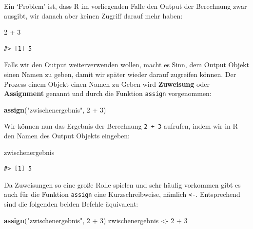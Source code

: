 \documentclass[]{tufte-book}
\newenvironment{Shaded}{}{}
\newcommand{\KeywordTok}[1]{\textcolor[rgb]{0.00,0.44,0.13}{\textbf{#1}}}
\newcommand{\DecValTok}[1]{\textcolor[rgb]{0.25,0.63,0.44}{#1}}
\newcommand{\StringTok}[1]{\textcolor[rgb]{0.25,0.44,0.63}{#1}}
\newcommand{\OperatorTok}[1]{\textcolor[rgb]{0.40,0.40,0.40}{#1}}
\newcommand{\NormalTok}[1]{#1}
\begin{document}
Ein `Problem' ist, dass R im vorliegenden Falle den Output der
Berechnung zwar ausgibt, wir danach aber keinen Zugriff darauf mehr
haben:

\begin{Shaded}
\begin{Highlighting}[]
\DecValTok{2} \OperatorTok{+}\StringTok{ }\DecValTok{3}
\end{Highlighting}
\end{Shaded}

\begin{verbatim}
#> [1] 5
\end{verbatim}

Falls wir den Output weiterverwenden wollen, macht es Sinn, dem Output
Objekt einen Namen zu geben, damit wir später wieder darauf zugreifen
können. Der Prozess einem Objekt einen Namen zu Geben wird
\textbf{Zuweisung} oder \textbf{Assignment} genannt und durch die
Funktion \texttt{assign} vorgenommen:

\begin{Shaded}
\begin{Highlighting}[]
\KeywordTok{assign}\NormalTok{(}\StringTok{"zwischenergebnis"}\NormalTok{, }\DecValTok{2} \OperatorTok{+}\StringTok{ }\DecValTok{3}\NormalTok{)}
\end{Highlighting}
\end{Shaded}

Wir können nun das Ergebnis der Berechnung \texttt{2\ +\ 3} aufrufen,
indem wir in R den Namen des Output Objekts eingeben:

\begin{Shaded}
\begin{Highlighting}[]
\NormalTok{zwischenergebnis}
\end{Highlighting}
\end{Shaded}

\begin{verbatim}
#> [1] 5
\end{verbatim}

Da Zuweisungen so eine große Rolle spielen und sehr häufig vorkommen
gibt es auch für die Funktion \texttt{assign} eine Kurzschreibweise,
nämlich \texttt{\textless{}-}. Entsprechend sind die folgenden beiden
Befehle äquivalent:

\begin{Shaded}
\begin{Highlighting}[]
\KeywordTok{assign}\NormalTok{(}\StringTok{"zwischenergebnis"}\NormalTok{, }\DecValTok{2} \OperatorTok{+}\StringTok{ }\DecValTok{3}\NormalTok{)}
\NormalTok{zwischenergebnis <-}\StringTok{ }\DecValTok{2} \OperatorTok{+}\StringTok{ }\DecValTok{3}
\end{Highlighting}
\end{Shaded}
\end{document}
